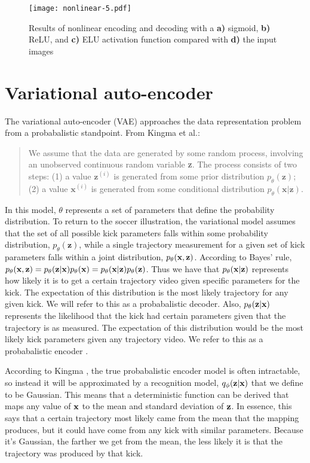 \documentclass{article}
\begin{document}
\begin{figure}[h]
\label{fig:nonlinear_reconstruction}
\begin{center}
\texttt{[image: nonlinear-5.pdf]} 
\caption{Results of nonlinear encoding and decoding with a \textbf{a)} sigmoid, \textbf{b)} ReLU, and \textbf{c)} ELU activation function compared with \textbf{d)} the input images}
\end{center}
\end{figure}

\section{Variational auto-encoder}
The variational auto-encoder (VAE) approaches the data representation problem from a probabalistic standpoint. From Kingma et al.:
\begin{quote}
We assume that the data are generated by some random process, involving an unobserved continuous random variable \textbf{z}. The process consists of two steps: (1) a value $\textbf{z}^{(i)}$ is generated from some prior distribution $p_\theta(\textbf{z})$; (2) a value $\textbf{x}^{(i)}$ is generated from some conditional distribution $p_\theta(\textbf{x}|\textbf{z})$.\cite{kingma}
\end{quote}
In this model, $\theta$ represents a set of parameters that define the probability distribution. To return to the soccer illustration, the variational model assumes that the set of all possible kick parameters falls within some probability distribution, $p_\theta(\textbf{z})$, while a single trajectory measurement for a given set of kick parameters falls within a joint distribution, $p_\theta(\textbf x,\textbf z)$. According to Bayes' rule, $p_\theta(\textbf x,\textbf z)=p_\theta(\textbf z|\textbf x) p_\theta(\textbf x)=p_\theta(\textbf x|\textbf z)p_\theta(\textbf z)$. Thus we have that $p_\theta(\textbf x | \textbf z)$ represents how likely it is to get a certain trajectory video given specific parameters for the kick. The expectation of this distribution is the most likely trajectory for any given kick. We will refer to this as a probabalistic decoder. Also, $p_\theta(\textbf z | \textbf x)$ represents the likelihood that the kick had certain parameters given that the trajectory is as measured. The expectation of this distribution would be the most likely kick parameters given any trajectory video. We refer to this as a probabalistic encoder \cite{kingma}.

According to Kingma \cite{kingma}, the true probabalistic encoder model is often intractable, so instead it will be approximated by a recognition model, $q_\phi(\textbf z | \textbf x)$ that we define to be Gaussian. This means that a deterministic function can be derived that maps any value of $\textbf x$ to the mean and standard deviation of $\textbf z$. In essence, this says that a certain trajectory most likely came from the mean that the mapping produces, but it could have come from any kick with similar parameters. Because it's Gaussian, the farther we get from the mean, the less likely it is that the trajectory was produced by that kick. 
\end{document}
